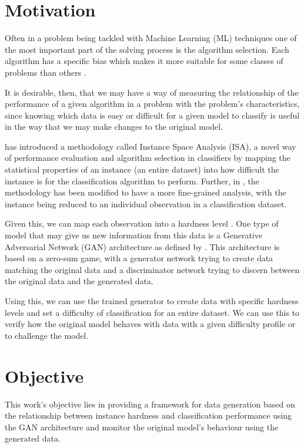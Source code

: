 \section{Motivation}
Often in a problem being tackled with Machine Learning (ML) techniques one of the most important part of the solving process is the algorithm selection. Each algorithm has a specific bias which makes it more suitable for some classes of problems than others \cite{Lorena2022}. 

It is desirable, then, that we may have a way of measuring the relationship of the performance of a given algorithm in a problem with the problem's characteristics, since knowing which data is easy or difficult for a given model to classify is useful in the way that we may make changes to the original model.

\cite{Munoz2018} has introduced a methodology called Instance Space Analysis (ISA), a novel way of performance evaluation and algorithm selection in classifiers by mapping the statistical properties of an instance (an entire dataset) into how difficult the instance is for the classification algorithm to perform. Further, in \cite{Lorena2022}, the methodology has been modified to have a more fine-grained analysis, with the instance being reduced to an individual observation in a classification dataset.

Given this, we can map each observation into a hardness level . One type of model that may give us new information from this data is a Generative Adversarial Network (GAN) architecture as defined by \cite{Goodfellow2014}. This architecture is based on a zero-sum game, with a generator network trying to create data matching the original data and a discriminator network trying to discern between the original data and the generated data. 

Using this, we can use the trained generator to create data with specific hardness levels and set a difficulty of classification for an entire dataset. We can use this to verify how the original model behaves with data with a given difficulty profile or to challenge the model.

\section{Objective}

This work's objective lies in providing a framework for data generation based on the relationship between instance hardness and classification performance using the GAN architecture and monitor the original model's behaviour using the generated data. 

